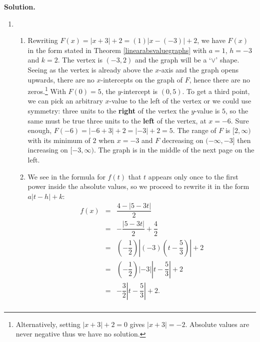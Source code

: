 \documentclass{ximera}
\begin{document}
\begin{ex}
\begin {enumerate}
\begin{center}
\end{center}

\end{enumerate}


{\bf Solution.}

\begin{enumerate}

\item \begin{enumerate}

\item Rewriting $F(x) = |x + 3| + 2 = (1)|x - (-3)| + 2$, we have $F(x)$ in the form stated in Theorem \ref{linearabsvaluegraphs} with $a = 1$, $h = -3$ and $k = 2$.  The vertex is $(-3, 2)$ and the graph will be a `$\vee$' shape.  Seeing as the vertex is already above the $x$-axis and the graph opens upwards, there are no $x$-intercepts on the graph of $F$, hence there are no zeros.\footnote{Alternatively, setting $|x + 3| + 2 = 0$ gives $|x + 3| = -2$. Absolute values are never negative thus we have no solution.}  With $F(0) = 5$, the $y$-intercept is $(0,5)$.  To get a third point, we can pick an arbitrary $x$-value to the left of the vertex or we could use symmetry: three units to the \textbf{right} of the vertex the $y$-value is $5$, so the same must be true three units to the \textbf{left} of the vertex, at $x = -6$.  Sure enough, $F(-6) = |-6 + 3| + 2 = |-3| + 2 = 5$.  The range of $F$ is $[2, \infty)$ with its minimum of $2$ when $x = -3$ and $F$ decreasing on $(-\infty, -3]$ then increasing on $[-3, \infty)$.  The graph is in the middle of the next page on the left.

\item We see in the formula for $f(t)$ that $t$ appears only once to the first power inside the absolute values, so we proceed to rewrite it in the form $a|t-h|+k$: \[ \begin{array}{rcl}

f(x) & =&  \dfrac{4 - |5-3t|}{2} \\ [10pt]
      & = & - \dfrac{|5-3t|}{2} + \dfrac{4}{2} \\ [12pt]
      & = & \left(-\dfrac{1}{2}\right) \left| (-3) \left( t - \dfrac{5}{3} \right) \right| + 2  \\  [12pt]
     & = &  \left(-\dfrac{1}{2}\right) |-3|  \left| t - \dfrac{5}{3}  \right|  + 2 \\ [12pt]
     & = & -\dfrac{3}{2}   \left| t - \dfrac{5}{3}  \right|  + 2.  \\ 
     

\end{array}\]
\end{enumerate}
\end{enumerate}
\end{ex}
\end{document}

